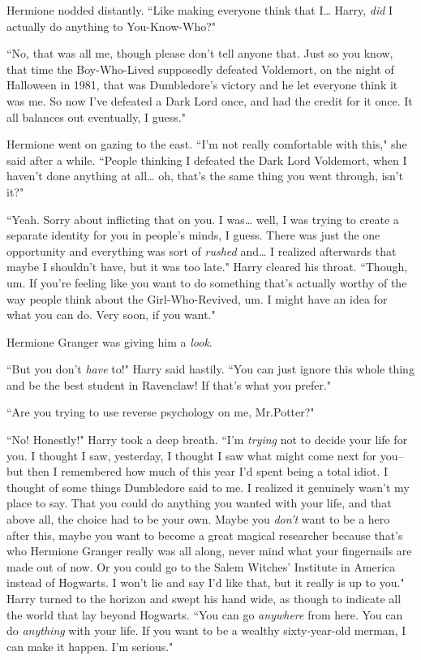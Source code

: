 Hermione nodded distantly. ``Like making everyone think that I{\ldots} Harry, \emph{did} I actually do anything to You-Know-Who?"

``No, that was all me, though please don't tell anyone that. Just so you know, that time the Boy-Who-Lived supposedly defeated Voldemort, on the night of Halloween in 1981, that was Dumbledore's victory and he let everyone think it was me. So now I've defeated a Dark Lord once, and had the credit for it once. It all balances out eventually, I guess."

Hermione went on gazing to the east. ``I'm not really comfortable with this," she said after a while. ``People thinking I defeated the Dark Lord Voldemort, when I haven't done anything at all{\ldots} oh, that's the same thing you went through, isn't it?"

``Yeah. Sorry about inflicting that on you. I was{\ldots} well, I was trying to create a separate identity for you in people's minds, I guess. There was just the one opportunity and everything was sort of \emph{rushed} and{\ldots} I realized afterwards that maybe I shouldn't have, but it was too late." Harry cleared his throat. ``Though, um. If you're feeling like you want to do something that's actually worthy of the way people think about the Girl-Who-Revived, um. I might have an idea for what you can do. Very soon, if you want."

Hermione Granger was giving him a \emph{look}.

``But you don't \emph{have} to!" Harry said hastily. ``You can just ignore this whole thing and be the best student in Ravenclaw! If that's what you prefer."

``Are you trying to use reverse psychology on me, Mr.\?Potter?"

``No! Honestly!" Harry took a deep breath. ``I'm \emph{trying} not to decide your life for you. I thought I saw, yesterday, I thought I saw what might come next for you\---but then I remembered how much of this year I'd spent being a total idiot. I thought of some things Dumbledore said to me. I realized it genuinely wasn't my place to say. That you could do anything you wanted with your life, and that above all, the choice had to be your own. Maybe you \emph{don't} want to be a hero after this, maybe you want to become a great magical researcher because that's who Hermione Granger really was all along, never mind what your fingernails are made out of now. Or you could go to the Salem Witches' Institute in America instead of Hogwarts. I won't lie and say I'd like that, but it really is up to you." Harry turned to the horizon and swept his hand wide, as though to indicate all the world that lay beyond Hogwarts. ``You can go \emph{anywhere} from here. You can do \emph{anything} with your life. If you want to be a wealthy sixty-year-old merman, I can make it happen. I'm serious."

